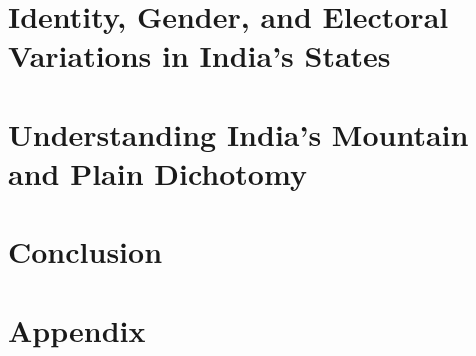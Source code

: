 \documentclass[11pt]{book}
\begin{document}
\chapter{Identity, Gender, and Electoral Variations in India's States}
\label{ch:ch1}


\chapter{ Understanding India's Mountain and Plain Dichotomy}
\label{ch:ch2}


\chapter{Conclusion}
\label{ch:conc}



\printbibliography %
\chapter{Appendix}
\label{ch:appendix}

\end{document}
